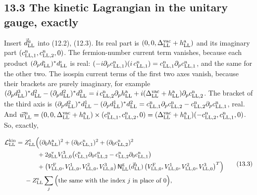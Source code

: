 \documentclass[
  10pt,
]{article}
\begin{document}
\hypertarget{the-kinetic-lagrangian-in-the-unitary-gauge-exactly}{%
\subsection{13.3 The kinetic Lagrangian in the unitary gauge,
exactly}\label{the-kinetic-lagrangian-in-the-unitary-gauge-exactly}}

Insert \(\vec d^{\rm u}_{\rm LL}\) into (12.2), (12.3). Its real part is
\((0,0,\Delta^{\rm vac}_{\rm LL}+h^{\rm a}_{\rm LL})\) and its imaginary
part \((c^{\rm n}_{{\rm LL},1},c^{\rm n}_{{\rm LL},2},0)\). The
fermion-number current term vanishes, because each product
\((\partial_pd^\iota_{\rm LL})^*d^\iota_{\rm LL}\) is real:
\((-i\partial_pc^{\rm n}_{{\rm LL},1})(i\,c^{\rm n}_{{\rm LL},1})=c^{\rm n}_{{\rm LL},1}\partial_pc^{\rm n}_{{\rm LL},1}\),
and the same for the other two. The isospin current terms of the first
two axes vanish, because their brackets are purely imaginary, for
example
\((\partial_pd^3_{\rm LL})^*d^2_{\rm LL}-(\partial_pd^2_{\rm LL})^*d^3_{\rm LL}=i\,c^{\rm n}_{{\rm LL},2}\partial_ph^{\rm a}_{\rm LL}+i(\Delta^{\rm vac}_{\rm LL}+h^{\rm a}_{\rm LL})\partial_pc^{\rm n}_{{\rm LL},2}\).
The bracket of the third axis is
\((\partial_pd^2_{\rm LL})^*d^1_{\rm LL}-(\partial_pd^1_{\rm LL})^*d^2_{\rm LL}=c^{\rm n}_{{\rm LL},1}\partial_pc^{\rm n}_{{\rm LL},2}-c^{\rm n}_{{\rm LL},2}\partial_pc^{\rm n}_{{\rm LL},1}\),
real. And
\(\vec w^{\rm n}_{\rm LL}=(0,0,\Delta^{\rm vac}_{\rm LL}+h^{\rm a}_{\rm LL})\times(c^{\rm n}_{{\rm LL},1},c^{\rm n}_{{\rm LL},2},0)=(\Delta^{\rm vac}_{\rm LL}+h^{\rm a}_{\rm LL})(-c^{\rm n}_{{\rm LL},2},c^{\rm n}_{{\rm LL},1},0)\).
So, exactly,

\[\begin{aligned}\mathcal L^{\rm kin}_{\rm LL}={}&Z^{\rm t}_{\rm LL}\Big((\partial_0h^{\rm a}_{\rm LL})^2+(\partial_0c^{\rm n}_{{\rm LL},1})^2+(\partial_0c^{\rm n}_{{\rm LL},2})^2\\&\qquad+2g^{\rm v}_{\rm LL}V^3_{{\rm LL},0}\big(c^{\rm n}_{{\rm LL},1}\partial_0c^{\rm n}_{{\rm LL},2}-c^{\rm n}_{{\rm LL},2}\partial_0c^{\rm n}_{{\rm LL},1}\big)\\&\qquad+\big(V^{\rm F}_{{\rm LL},0},V^1_{{\rm LL},0},V^2_{{\rm LL},0},V^3_{{\rm LL},0}\big)\,\mathsf N^{\rm g}_{\rm LL}(\vec d^{\rm u}_{\rm LL})\,\big(V^{\rm F}_{{\rm LL},0},V^1_{{\rm LL},0},V^2_{{\rm LL},0},V^3_{{\rm LL},0}\big)^T\Big)\\&-Z^{\rm s}_{\rm LL}\sum_j\Big(\text{the same with the index }j\text{ in place of }0\Big),\end{aligned}\tag{13.3}\]
\end{document}
